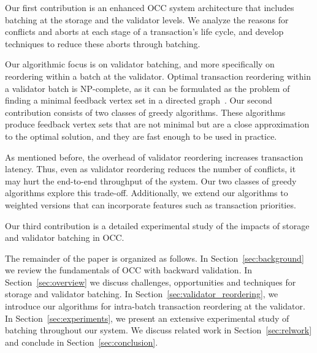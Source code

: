 Our first contribution is an enhanced OCC system architecture that includes batching at the storage and the  validator levels. We analyze the reasons for conflicts and aborts at each stage of a transaction's life cycle, and develop techniques to reduce these aborts through batching.

Our algorithmic focus is on validator batching, and more specifically on reordering within a batch at the validator. Optimal transaction reordering within a validator batch is NP-complete, as it can be formulated as the problem of finding a minimal feedback vertex set in a directed graph~\cite{karp1972reducibility}. Our second contribution consists of two classes of greedy algorithms. These algorithms produce feedback vertex sets that are not minimal but are a close approximation to the optimal solution, and they are fast enough to be used in practice. 

As mentioned before, the overhead of validator reordering increases transaction latency. Thus, even as validator reordering reduces the number of conflicts, it may hurt the end-to-end throughput of the system. Our two classes of greedy algorithms explore this trade-off. Additionally, we extend our algorithms to weighted versions that can incorporate features such as transaction priorities.

Our third contribution is a detailed experimental study of the impacts of storage and validator batching in OCC.

The remainder of the paper is organized as follows. In Section~\ref{sec:background}  we review the fundamentals of OCC with backward validation. In Section~\ref{sec:overview} we discuss challenges, opportunities and techniques for storage and validator batching. In Section~\ref{sec:validator_reordering}, we introduce our algorithms for intra-batch transaction reordering at the validator. In Section~\ref{sec:experiments}, we present an extensive experimental study of batching throughout our system. We discuss related work in Section~\ref{sec:relwork} and conclude in Section~\ref{sec:conclusion}.

